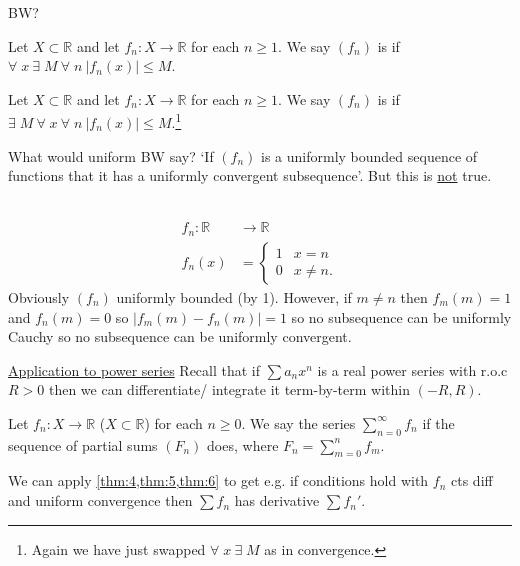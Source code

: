 BW?

\begin{definition}
    Let $X \subset \mathbb{R}$ and let $f_n : X \to \mathbb{R}$ for each $n \geq 1$.
    We say $(f_n)$ is  if $\forall \; x \ \exists \; M \ \forall \; n \ |f_n(x)| \leq M$.
\end{definition} 

\begin{definition}
    Let $X \subset \mathbb{R}$ and let $f_n : X \to \mathbb{R}$ for each $n \geq 1$.
    We say $(f_n)$ is  if $\exists \; M \ \forall \; x \ \forall \; n \ |f_n(x)| \leq M$.\footnote{Again we have just swapped $\forall \; x \ \exists \; M$ as in convergence.}
\end{definition} 

What would uniform BW say?
`If $(f_n)$ is a uniformly bounded sequence of functions that it has a uniformly convergent subsequence'.
But this is \underline{not} true.

\begin{example}[Counterexample of BW] ~\vspace*{-1.5\baselineskip}
    \begin{align*}
        f_n : \mathbb{R} &\to \mathbb{R} \\
        f_n(x) &= \begin{cases}
            1 & x = n \\
            0 & x \neq n.
        \end{cases}
    \end{align*} 
    Obviously $(f_n)$ uniformly bounded (by 1).
    However, if $m \neq n$ then $f_m(m) = 1$ and $f_n(m) = 0$ so $|f_m(m) - f_n(m)| = 1$ so no subsequence can be uniformly Cauchy so no subsequence can be uniformly convergent.
\end{example} 

\underline{Application to power series}
Recall that if $\sum a_n x^n$ is a real power series with r.o.c $R > 0$ then we can differentiate/ integrate it term-by-term within $(-R, R)$.

\begin{definition}
    Let $f_n : X \to \mathbb{R}$ ($X \subset \mathbb{R}$) for each $n \geq 0$.
    We say the series $\sum_{n=0}^{\infty} f_n$  if the sequence of partial sums $(F_n)$ does, where $F_n = \sum_{m=0}^{n} f_m$.
\end{definition} 
We can apply \cref{thm:4,thm:5,thm:6} to get e.g. if conditions hold with $f_n$ cts diff and uniform convergence then $\sum f_n$ has derivative $\sum f_n'$.

